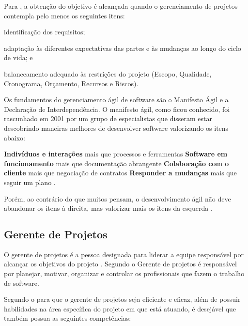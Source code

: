 \documentclass[
    12pt,               %
    openright,          %
    twoside,            %
    a4paper,            %
    chapter=TITLE,     %
    english,            %
    spanish,            %
    portuguese              %
    ]{abntex2}
\begin{document}
Para , a obtenção do objetivo é alcançada quando o gerenciamento de projetos contempla pelo menos os seguintes itens:

\begin{alineas}
	\item identificação dos requisitos;
	\item adaptação às diferentes expectativas das partes e às mudanças ao longo do ciclo de vida; e
	\item balanceamento adequado às restrições do projeto (Escopo, Qualidade, Cronograma, Orçamento, Recursos e Riscos).
\end{alineas}

Os fundamentos do gerenciamento ágil de software são o Manifesto Ágil e a Declaração de Interdependência.
O manifesto ágil, como ficou conhecido, foi rascunhado em 2001 por um grupo de especialistas que disseram estar descobrindo maneiras melhores de desenvolver software valorizando os itens abaixo:

\begin{citacao}
\textbf{Indivíduos e interações} mais que processos e ferramentas \newline
\textbf{Software em funcionamento} mais que documentação abrangente \newline
\textbf{Colaboração com o cliente} mais que negociação de contratos \newline
\textbf{Responder a mudanças} mais que seguir um plano \cite{manifesto2001}.
\end{citacao}

Porém, ao contrário do que muitos pensam, o desenvolvimento ágil não deve abandonar os itens à direita, mas valorizar mais os itens da esquerda \cite{manifesto2001}.

\subsection{Gerente de Projetos}
O gerente de projetos é a pessoa designada para liderar a equipe responsável por alcançar os objetivos do projeto \cite[p.~16]{pmi2013}. Segundo  o Gerente de projetos é responsável por planejar, motivar, organizar e controlar os profissionais que fazem o trabalho de software.

Segundo o  para que o gerente de projetos seja eficiente e eficaz, além de possuir habilidades na área específica do projeto em que está atuando, é desejável que também possua as seguintes competências:
\end{document}
